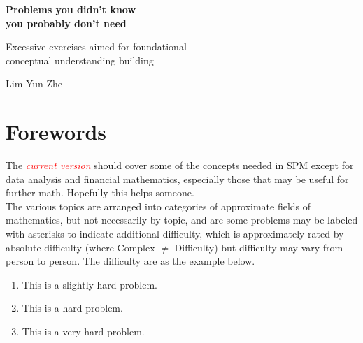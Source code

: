 \documentclass{article}
\title{}\date{}\author{}
\newcommand{\prestar}{\vspace*{0.3em}\hspace*{\fill}}
\newcommand{\onestar}{\marginpar{\prestar\textcolor{red}{$\ast$}}}
\newcommand{\twostar}{\marginpar{\prestar\textcolor{red}{$\ast$$\ast$}}}
\newcommand{\threestar}{\marginpar{\prestar\textcolor{red}{$\ast$$\ast$$\ast$}}}
\begin{document}
\Huge
\begin{titlepage}
   \begin{center}
       \vspace*{7cm}

       \textbf{Problems you didn't know \\you probably don't need}

       \vspace{1cm}
\LARGE
        Excessive exercises aimed for foundational \\conceptual understanding building
            
       \vspace{1cm}
\Large
       Lim Yun Zhe
      
   \end{center}
\end{titlepage}
\normalsize
\section*{Forewords}
The \textcolor{red}{\textit{current version}} should cover some of the concepts needed in SPM except for data analysis and financial mathematics, especially those that may be useful for further math. Hopefully this helps someone.\\[\baselineskip]
The various topics are arranged into categories of approximate fields of mathematics, but not necessarily by topic, and are some problems may be labeled with asterisks to indicate additional difficulty, which is approximately rated by absolute difficulty (where Complex $\neq$ Difficulty) but difficulty may vary from person to person. The difficulty are as the example below.
\begin{enumerate}
       \item \onestar This is a slightly hard problem.
       \item \twostar This is a hard problem.
       \item \threestar This is a very hard problem. 
\end{enumerate}
\tableofcontents

\newpage\noindent
\end{document}
